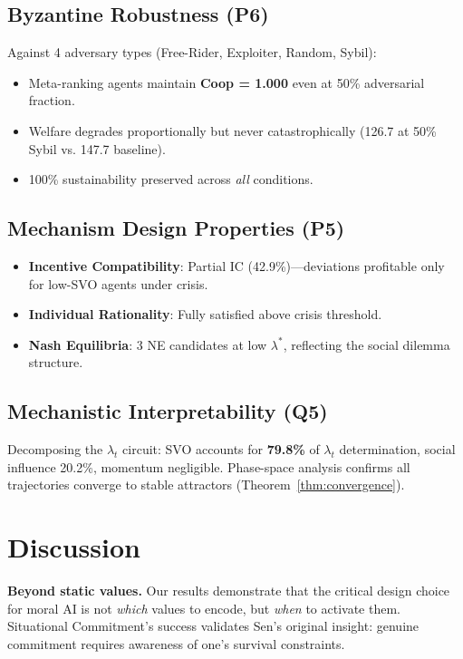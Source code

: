\documentclass{article}
\begin{document}
\subsection{Byzantine Robustness (P6)}

Against 4 adversary types (Free-Rider, Exploiter, Random, Sybil):
\begin{itemize}
    \item Meta-ranking agents maintain \textbf{Coop = 1.000} even at 50\% adversarial fraction.
    \item Welfare degrades proportionally but never catastrophically (126.7 at 50\% Sybil vs. 147.7 baseline).
    \item 100\% sustainability preserved across \textit{all} conditions.
\end{itemize}

\subsection{Mechanism Design Properties (P5)}

\begin{itemize}
    \item \textbf{Incentive Compatibility}: Partial IC (42.9\%)---deviations profitable only for low-SVO agents under crisis.
    \item \textbf{Individual Rationality}: Fully satisfied above crisis threshold.
    \item \textbf{Nash Equilibria}: 3 NE candidates at low $\lambda^*$, reflecting the social dilemma structure.
\end{itemize}

\subsection{Mechanistic Interpretability (Q5)}

Decomposing the $\lambda_t$ circuit: SVO accounts for \textbf{79.8\%} of $\lambda_t$ determination, social influence 20.2\%, momentum negligible. Phase-space analysis confirms all trajectories converge to stable attractors (Theorem~\ref{thm:convergence}).

\section{Discussion}

\textbf{Beyond static values.} Our results demonstrate that the critical design choice for moral AI is not \textit{which} values to encode, but \textit{when} to activate them. Situational Commitment's success validates Sen's original insight: genuine commitment requires awareness of one's survival constraints.
\end{document}
